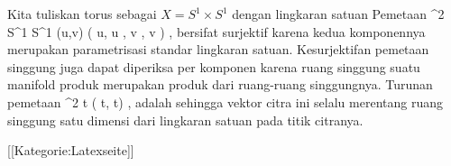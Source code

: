 
Kita tuliskan torus sebagai $X=S^1 \times S^1$ dengan lingkaran satuan
Pemetaan
\maabbeledisp {\varphi} {\R^2} {S^1 \times S^1
} {(u,v)} {( \cos  u, \sin  u , \cos  v , \sin  v )
} {,}
bersifat surjektif karena kedua komponennya merupakan parametrisasi standar lingkaran satuan. Kesurjektifan pemetaan singgung juga dapat diperiksa per komponen karena ruang singgung suatu manifold produk merupakan produk dari ruang-ruang singgungnya. Turunan pemetaan
\maabbeledisp {} {\R} { \R^2
} { t } { ( \cos  t, \sin  t)
} {,}
adalah
 sehingga vektor citra ini selalu merentang ruang singgung satu dimensi dari lingkaran satuan pada titik citranya.

 [[Kategorie:Latexseite]]
